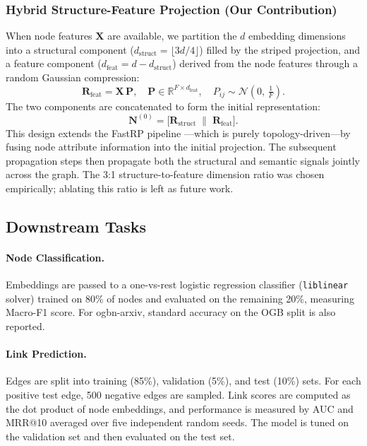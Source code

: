 \documentclass[conference]{IEEEtran}
\begin{document}
\subsubsection{Hybrid Structure-Feature Projection (Our Contribution)}
When node features $\mathbf{X}$ are available, we partition the $d$
embedding dimensions into a structural component ($d_\text{struct} =
\lfloor 3d/4 \rfloor$) filled by the striped projection, and a feature
component ($d_\text{feat} = d - d_\text{struct}$) derived from the node
features through a random Gaussian compression:
\begin{equation}
    \mathbf{R}_\text{feat} = \mathbf{X}\, \mathbf{P},
    \quad \mathbf{P} \in \mathbb{R}^{F \times d_\text{feat}},
    \quad P_{ij} \sim \mathcal{N}\!\left(0,\, \tfrac{1}{F}\right).
    \label{eq:hybrid-feat}
\end{equation}
The two components are concatenated to form the initial representation:
\begin{equation}
    \mathbf{N}^{(0)} = \bigl[\mathbf{R}_\text{struct} \;\|\; \mathbf{R}_\text{feat}\bigr].
    \label{eq:hybrid-concat}
\end{equation}
This design extends the FastRP pipeline \cite{chen2019fast}---which is
purely topology-driven---by fusing node attribute information into the
initial projection. The subsequent propagation steps then propagate both
the structural and semantic signals jointly across the graph. The 3:1
structure-to-feature dimension ratio was chosen empirically; ablating
this ratio is left as future work.

\subsection{Downstream Tasks}

\paragraph{Node Classification.}
Embeddings are passed to a one-vs-rest logistic regression classifier
(\texttt{liblinear} solver) trained on 80\% of nodes and evaluated on the
remaining 20\%, measuring Macro-F1 score. For ogbn-arxiv, standard
accuracy on the OGB split is also reported.

\paragraph{Link Prediction.}
Edges are split into training (85\%), validation (5\%), and test (10\%)
sets. For each positive test edge, 500 negative edges are sampled. Link
scores are computed as the dot product of node embeddings, and performance
is measured by AUC and MRR@10 averaged over five independent random seeds.
The model is tuned on the validation set and then evaluated on the test set.
\end{document}
